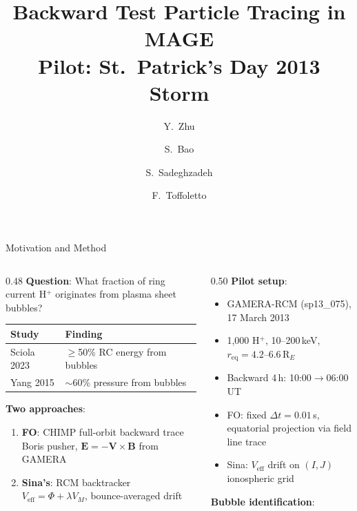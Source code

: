 \documentclass[aspectratio=169,11pt]{beamer}
\title{Backward Test Particle Tracing in MAGE\\[4pt]
{\normalsize Pilot: St.\ Patrick's Day 2013 Storm}}
\author{Y.\ Zhu \and S.\ Bao \and S.\ Sadeghzadeh \and F.\ Toffoletto}
\institute{Rice University}
\date{}
\begin{document}
\begin{frame}
\titlepage
\end{frame}

\begin{frame}{Motivation and Method}

\begin{columns}[T]
\begin{column}{0.48\textwidth}
\textbf{Question}: What fraction of ring current H$^+$ originates from plasma sheet bubbles?

\vspace{6pt}
\footnotesize
\begin{tabular}{@{}p{1.8cm}p{3.8cm}@{}}
\toprule
\textbf{Study} & \textbf{Finding} \\
\midrule
Sciola 2023 & $\geq$50\% RC energy from bubbles \\
Yang 2015 & $\sim$60\% pressure from bubbles \\
\bottomrule
\end{tabular}

\vspace{6pt}
\normalsize
\textbf{Two approaches}:
\begin{enumerate}
\item \textbf{FO}: CHIMP full-orbit backward trace\\
{\footnotesize Boris pusher, $\mathbf{E}=-\mathbf{V}\times\mathbf{B}$ from GAMERA}
\item \textbf{Sina's}: RCM backtracker\\
{\footnotesize $V_\text{eff} = \Phi + \lambda V_M$, bounce-averaged drift}
\end{enumerate}
\end{column}
\begin{column}{0.50\textwidth}
\footnotesize
\textbf{Pilot setup}:
\begin{itemize}\setlength\itemsep{1pt}
\item GAMERA-RCM (sp13\_075), 17 March 2013
\item 1{,}000 H$^+$, 10--200\,keV, $r_\text{eq}=4.2$--6.6\,R$_E$
\item Backward 4\,h: 10:00$\to$06:00\,UT
\item FO: fixed $\Delta t=0.01$\,s, equatorial projection via field line trace
\item Sina: $V_\text{eff}$ drift on $(I,J)$ ionospheric grid
\end{itemize}

\vspace{4pt}
\textbf{Bubble identification}:


\end{column}
\end{columns}
\end{frame}
\end{document}
